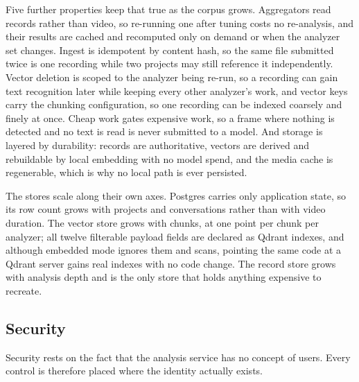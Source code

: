 \documentclass[11pt,a4paper]{article}
\begin{document}
Five further properties keep that true as the corpus grows. Aggregators read
records rather than video, so re-running one after tuning costs no re-analysis,
and their results are cached and recomputed only on demand or when the analyzer
set changes. Ingest is idempotent by content hash, so the same file submitted
twice is one recording while two projects may still reference it independently.
Vector deletion is scoped to the analyzer being re-run, so a recording can gain
text recognition later while keeping every other analyzer's work, and vector
keys carry the chunking configuration, so one recording can be indexed coarsely
and finely at once. Cheap work gates expensive work, so a frame where nothing is
detected and no text is read is never submitted to a model. And storage is
layered by durability: records are authoritative, vectors are derived and
rebuildable by local embedding with no model spend, and the media cache is
regenerable, which is why no local path is ever persisted.

The stores scale along their own axes. Postgres carries only application state,
so its row count grows with projects and conversations rather than with video
duration. The vector store grows with chunks, at one point per chunk per
analyzer; all twelve filterable payload fields are declared as Qdrant indexes,
and although embedded mode ignores them and scans, pointing the same code at a
Qdrant server gains real indexes with no code change. The record store grows
with analysis depth and is the only store that holds anything expensive to
recreate.

\subsection{Security}

Security rests on the fact that the analysis service has no concept of users.
Every control is therefore placed where the identity actually exists.
\end{document}
